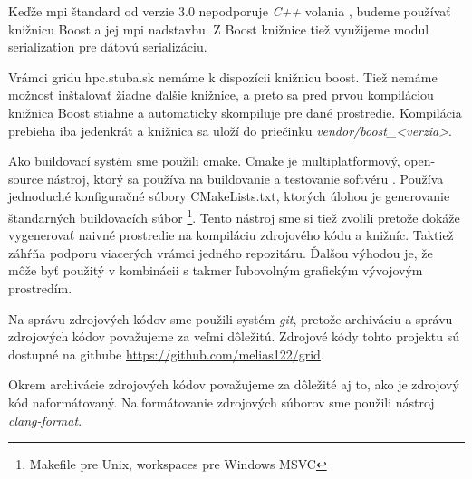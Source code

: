 Keďže \acrshort{mpi} štandard od verzie 3.0 nepodporuje \textit{C++} volania \cite{mpi3-1},
budeme používať knižnicu Boost a jej \acrshort{mpi} nadstavbu. Z Boost knižnice tiež využijeme modul serialization pre dátovú serializáciu.

Vrámci gridu hpc.stuba.sk nemáme k dispozícii knižnicu boost. Tiež nemáme možnosť inštalovať žiadne ďalšie knižnice,
a preto sa pred prvou kompiláciou knižnica Boost stiahne a automaticky skompiluje pre dané prostredie.
Kompilácia prebieha iba jedenkrát a knižnica sa uloží do priečinku \textit{vendor/boost\_<verzia>}.

Ako buildovací systém sme použili cmake.
Cmake je multiplatformový, open-source nástroj, ktorý sa používa na buildovanie a testovanie softvéru \cite{cmake-doc}.
Používa jednoduché konfiguračné súbory CMakeLists.txt, ktorých úlohou je generovanie štandarných buildovacích súbor \footnote{Makefile pre Unix, workspaces pre Windows MSVC}. Tento nástroj sme si tiež zvolili pretože dokáže vygenerovať naivné prostredie na kompiláciu zdrojového kódu a knižníc.
Taktiež záhŕňa podporu viacerých  vrámci jedného repozitáru.
Ďalšou výhodou je, že môže byť použitý v kombinácii s takmer ľubovolným grafickým vývojovým prostredím.

Na správu zdrojových kódov sme použili systém \textit{git}, pretože archiváciu a správu zdrojových kódov považujeme za veľmi dôležitú.
Zdrojové kódy tohto projektu sú dostupné na githube \url{https://github.com/melias122/grid}.

Okrem archivácie zdrojových kódov považujeme za dôležité aj to, ako je zdrojový kód naformátovaný.
Na formátovanie zdrojových súborov sme použili nástroj \textit{clang-format}.

